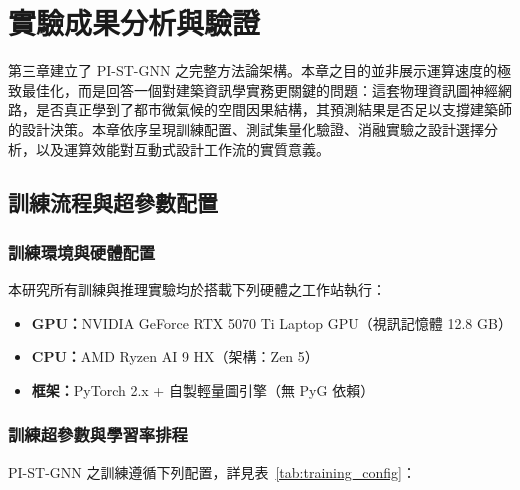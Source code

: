 \chapter{實驗成果分析與驗證}
\label{chapter:experiments}

第三章建立了 PI-ST-GNN 之完整方法論架構。本章之目的並非展示運算速度的極致最佳化，而是回答一個對建築資訊學實務更關鍵的問題：這套物理資訊圖神經網路，是否真正學到了都市微氣候的空間因果結構，其預測結果是否足以支撐建築師的設計決策。本章依序呈現訓練配置、測試集量化驗證、消融實驗之設計選擇分析，以及運算效能對互動式設計工作流的實質意義。


\section{訓練流程與超參數配置}
\label{sec:training}

\subsection{訓練環境與硬體配置}
\label{subsec:hardware}

本研究所有訓練與推理實驗均於搭載下列硬體之工作站執行：

\begin{itemize}
    \item \textbf{GPU：}NVIDIA GeForce RTX 5070 Ti Laptop GPU（視訊記憶體 12.8 GB）
    \item \textbf{CPU：}AMD Ryzen AI 9 HX（架構：Zen 5）
    \item \textbf{框架：}PyTorch 2.x + 自製輕量圖引擎（無 PyG 依賴）
\end{itemize}


\subsection{訓練超參數與學習率排程}
\label{subsec:training_params}

PI-ST-GNN 之訓練遵循下列配置，詳見表~\ref{tab:training_config}：

